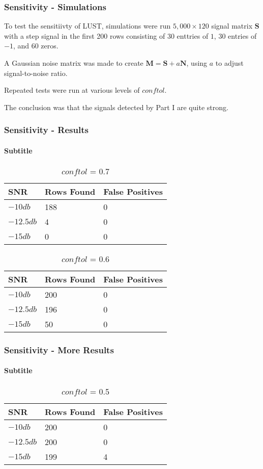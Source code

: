 \documentclass[
	11pt, %
]{beamer}
\begin{document}
\begin{frame}
    \frametitle{Sensitivity - Simulations}

    To test the sensitiivty of LUST, simulations were run $5,000 \times 120$ signal matrix $\mathbf{S}$ with a step signal in the first 200 rows consisting of 30 enttries of $1$, 30 entries of $-1$, and 60 zeros.
    
    \bigskip

    A Gaussian noise matrix was made to create $\mathbf{M} = \mathbf{S} + a\mathbf{N}$, using $a$ to adjust signal-to-noise ratio.

    \bigskip

    Repeated tests were run at various levels of $conftol$. 

    \bigskip

    The conclusion was that the signals detected by Part I are quite strong.

\end{frame}

\begin{frame}
	\frametitle{Sensitivity - Results}
	\framesubtitle{Subtitle} %
	
	\begin{table}
		\begin{tabular}{l l l}
			\toprule
			\textbf{SNR} & \textbf{Rows Found} & \textbf{False Positives}\\
			\midrule
			$-10db$ & 188 & 0 \\
			$-12.5db$ & 4 & 0 \\
			$-15db$ & 0 & 0 \\
			\bottomrule
		\end{tabular}
		\caption{$conftol$ = 0.7}
	\end{table}

    \begin{table}
		\begin{tabular}{l l l}
			\toprule
			\textbf{SNR} & \textbf{Rows Found} & \textbf{False Positives}\\
			\midrule
			$-10db$ & 200 & 0 \\
			$-12.5db$ & 196 & 0 \\
			$-15db$ & 50 & 0 \\
			\bottomrule
		\end{tabular}
		\caption{$conftol$ = 0.6}
	\end{table}
\end{frame}

\begin{frame}
	\frametitle{Sensitivity - More Results}
	\framesubtitle{Subtitle} %
	
	\begin{table}
		\begin{tabular}{l l l}
			\toprule
			\textbf{SNR} & \textbf{Rows Found} & \textbf{False Positives}\\
			\midrule
			$-10db$ & 200 & 0 \\
			$-12.5db$ & 200 & 0 \\
			$-15db$ & 199 & 4 \\
			\bottomrule
		\end{tabular}
		\caption{$conftol$ = 0.5}
	\end{table}
\end{frame}
\end{document}
